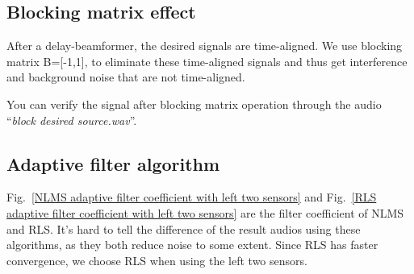 \documentclass[onecolumn, conference]{IEEEtran}
\begin{document}
\subsection{Blocking matrix effect}

After a delay-beamformer, the desired signals are time-aligned. We use blocking matrix B=[-1,1], to eliminate these time-aligned signals and thus get interference and background noise that are not time-aligned.

You can verify the signal after blocking matrix operation through the audio ``\textit{block desired source.wav}''.
\subsection{Adaptive filter algorithm}

Fig.~\ref{NLMS adaptive filter coefficient with left two sensors} and Fig.~\ref{RLS adaptive filter coefficient with left two sensors} are the filter coefficient of NLMS and RLS. It's hard to tell the difference of the result audios using these algorithms, as they both reduce noise to some extent. Since RLS has faster convergence, we choose RLS when using the left two sensors.
\end{document}
